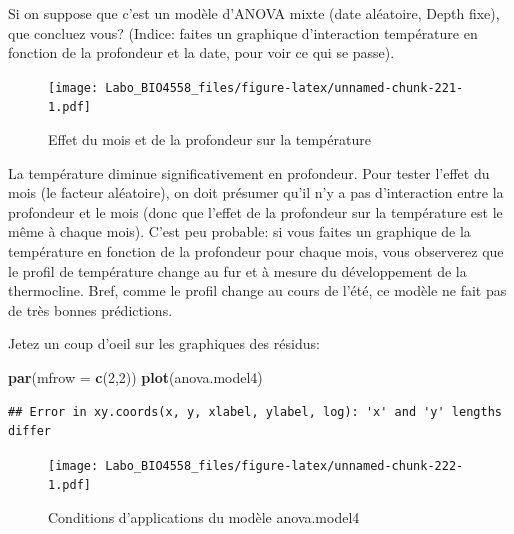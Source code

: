 \documentclass[12pt,]{book}
\newenvironment{Shaded}{\begin{snugshade}}{\end{snugshade}}
\newcommand{\DataTypeTok}[1]{\textcolor[rgb]{0.27,0.27,0.27}{#1}}
\newcommand{\DecValTok}[1]{\textcolor[rgb]{0.06,0.06,0.06}{#1}}
\newcommand{\KeywordTok}[1]{\textcolor[rgb]{0.27,0.27,0.27}{\textbf{#1}}}
\newcommand{\NormalTok}[1]{#1}
\newcommand{\OperatorTok}[1]{\textcolor[rgb]{0.43,0.43,0.43}{\textbf{#1}}}
\begin{document}
Si on suppose que c'est un modèle d'ANOVA mixte (date aléatoire, Depth fixe), que concluez vous? (Indice: faites un graphique d'interaction température en fonction de la profondeur et la date, pour voir ce qui se passe).

\begin{Shaded}
\end{Shaded}

\begin{figure}
\centering
\texttt{[image: Labo\_BIO4558\_files/figure-latex/unnamed-chunk-221-1.pdf]}
\caption{\label{fig:unnamed-chunk-221}Effet du mois et de la profondeur sur la température}
\end{figure}

La température diminue significativement en profondeur. Pour tester l'effet du mois (le facteur aléatoire), on doit présumer qu'il n'y a pas d'interaction entre la profondeur et le mois (donc que l'effet de la profondeur sur la température est le même à chaque mois). C'est peu probable: si vous faites un graphique de la température en fonction de la profondeur pour chaque mois, vous observerez que le profil de température change au fur et à mesure du développement de la thermocline. Bref, comme le profil change au cours de l'été, ce modèle ne fait pas de très bonnes prédictions.

Jetez un coup d'oeil sur les graphiques des résidus:

\begin{Shaded}
\begin{Highlighting}[]
\KeywordTok{par}\NormalTok{(}\DataTypeTok{mfrow =} \KeywordTok{c}\NormalTok{(}\DecValTok{2}\NormalTok{,}\DecValTok{2}\NormalTok{))}
\KeywordTok{plot}\NormalTok{(anova.model4)}
\end{Highlighting}
\end{Shaded}

\begin{verbatim}
## Error in xy.coords(x, y, xlabel, ylabel, log): 'x' and 'y' lengths differ
\end{verbatim}

\begin{figure}
\centering
\texttt{[image: Labo\_BIO4558\_files/figure-latex/unnamed-chunk-222-1.pdf]}
\caption{\label{fig:unnamed-chunk-222}Conditions d'applications du modèle anova.model4}
\end{figure}
\end{document}
